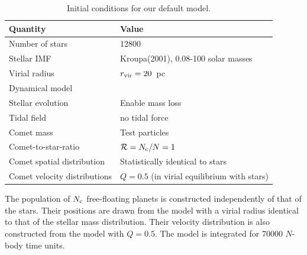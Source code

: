 \documentclass[usenatbib]{mn2e}
\newcommand{\ncomets}{N_{\rm c}}
\newcommand{\ratio}{\mathcal{R}}
\newcommand{\rvir}{r_{\rm vir}}
\newcommand{\qc}{Q_{\rm c}}
\newcommand{\qe}{Q_{\rm e}}
\newcommand{\qh}{Q_{\rm h}}
\begin{document}
\begin{table}
\caption{Initial conditions for our default model.  \label{table:initial}}
\begin{tabular}{ll}
\hline
\hline
Quantity & Value \\
\hline
Number of stars &  12800 \\
Stellar IMF &  Kroupa(2001), 0.08-100 solar masses\\ %
Virial radius & $\rvir=20$~pc \\ %
Dynamical model & \cite{Plummer:1911aa} \\
Stellar evolution &  Enable mass loss \\ %
Tidal field & no tidal force\\ %
\hline
Comet mass & Test particles \\
Comet-to-star-ratio & $\ratio=\ncomets/N= 1$ \\
Comet spatial distribution & Statistically identical to stars \\
Comet velocity distributions & $Q=0.5$ (in virial equilibrium with stars) \\
\hline
\hline
\end{tabular}
\end{table}






The population of $\ncomets$ free-floating planets is constructed independently of that of the stars. Their positions are drawn from the \cite{Plummer:1911aa} model with a virial radius identical to that of the stellar mass distribution. Their velocity distribution is also constructed from the \cite{Plummer:1911aa} model with $Q=0.5$. The model is integrated for 70000 $N$-body time units.%


\end{document}

